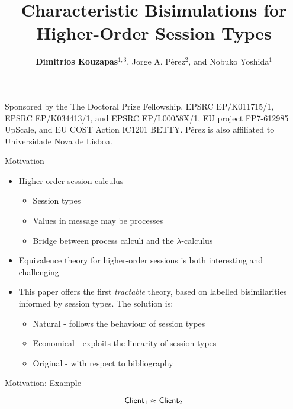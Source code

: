 \documentclass{beamer}
\title{Characteristic Bisimulations for Higher-Order Session Types}
\author{{\bf Dimitrios Kouzapas$^{1,3}$}, Jorge A. P\'{e}rez$^{2}$, and Nobuko Yoshida$^1$}
\institute{Imperial College London$^1$, University of Groningen$^2$, University of Glasgow$^3$}
\date
\begin{document}
	\begin{frame}
		\titlepage

		{ \tiny %
		Sponsored by the The Doctoral Prize Fellowship, EPSRC EP/K011715/1,
		EPSRC EP/K034413/1, and EPSRC EP/L00058X/1,
		EU project FP7-612985 UpScale, and EU COST Action IC1201 BETTY.  
		P\'{e}rez is  also affiliated to
		Universidade Nova de Lisboa.%
		}
	\end{frame}

	\begin{frame}{Motivation}
		\begin{itemize}
			\item	Higher-order session calculus

				\begin{itemize}
					\item	Session types
					\item	Values in message may be processes
					\item	Bridge between process calculi and the $\lambda$-calculus
				\end{itemize}


			\item	Equivalence theory for higher-order sessions is both interesting and challenging

			\item	This paper offers the first {\em tractable} theory, based on labelled bisimilarities
				informed by session types. The solution is:
				\begin{itemize}
					\item	Natural - follows the behaviour of session types
					\item	Economical - exploits the linearity of session types
					\item	Original - with respect to bibliography
				\end{itemize}
		\end{itemize}
	\end{frame}

	\begin{frame}{Motivation: Example}
		

		\[
			\mathsf{Client}_1 \approx \mathsf{Client}_2
		\]
	\end{frame}
\end{document}
